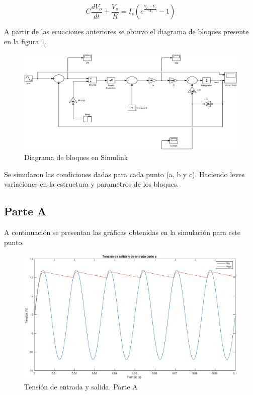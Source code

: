 \documentclass[12pt,letterpaper]{article}
\begin{document}
\begin{equation}
C \frac{dV_o}{dt} + \frac{V_o}{R} = I_s\left(e^{\frac{V_{in}-V_{o}}{nV_t}}-1\right)
\end{equation}

A partir de las ecuaciones anteriores se obtuvo el diagrama de bloques presente en la figura \ref{fig:diag_bloques_2}.


\begin{figure}[ht!]
  \centering
  \includegraphics[width=0.8\linewidth]{pictures/Ejercicio2_Diagrama_Bloques.eps}
  \caption{Diagrama de bloques en Simulink}
  \label{fig:diag_bloques_2}
\end{figure}

Se simularon las condiciones dadas para cada punto (a, b y c). Haciendo leves variaciones en la estructura y parametros de los bloques.

\subsection{Parte A}
A continuación se presentan las gráficas obtenidas en la simulación para este punto. 

\begin{figure}[ht!]
  \centering
  \includegraphics[width=1.0\linewidth]{pictures/Ejercicio2_a_Vin_Vout.eps}
  \caption{Tensión de entrada y salida. Parte A}
  \label{fig:2_a_Vin_Vout}
\end{figure}
\end{document}
